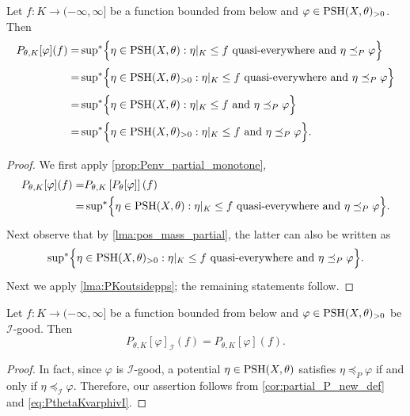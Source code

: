 \begin{corollary}\label{cor:partial_P_new_def}
    Let $f\colon K\rightarrow (-\infty,\infty]$ be a function bounded from below and $\varphi \in \mathrm{PSH}(X,\theta)_{>0}$. Then
    \[
    \begin{aligned}
    P_{\theta,K}[\varphi](f)= & \operatorname*{sup}_{}{}\!{}^{*} \Bigl\{ \eta \in \mathrm{PSH}(X,\theta): \eta|_K \leq f  \textup{ quasi-everywhere and } \eta\preceq_P \varphi\Bigr\}\\
    =& \operatorname*{sup}_{}{}\!{}^{*} \Bigl\{ \eta \in \mathrm{PSH}(X,\theta)_{>0}: \eta|_K \leq f  \textup{ quasi-everywhere and } \eta\preceq_P \varphi\Bigr\}\\
    =& \operatorname*{sup}_{}{}\!{}^{*} \Bigl\{ \eta \in \mathrm{PSH}(X,\theta): \eta|_K \leq f  \textup{ and } \eta\preceq_P \varphi\Bigr\}\\
    =& \operatorname*{sup}_{}{}\!{}^{*} \Bigl\{ \eta \in \mathrm{PSH}(X,\theta)_{>0}: \eta|_K \leq f  \textup{ and } \eta\preceq_P \varphi\Bigr\}.
    \end{aligned}
    \]
\end{corollary}
\begin{proof}
    We first apply \cref{prop:Penv_partial_monotone},
    \[
    \begin{split}
    P_{\theta,K}[\varphi](f)= & P_{\theta,K}\left[P_{\theta}[\varphi]\right](f)\\
    =& \operatorname*{sup}_{}{}\!{}^{*} \Bigl\{ \eta \in \mathrm{PSH}(X,\theta): \eta|_K \leq f  \textup{ quasi-everywhere and } \eta\preceq_P \varphi\Bigr\}.
    \end{split}
    \]
    Next observe that by \cref{lma:pos_mass_partial}, the latter can also be written as
    \[
    \operatorname*{sup}_{}{}\!{}^{*} \Bigl\{ \eta \in \mathrm{PSH}(X,\theta)_{>0}: \eta|_K \leq f  \textup{ quasi-everywhere and } \eta\preceq_P \varphi\Bigr\}.
    \]
    Next we apply \cref{lma:PKoutsidepps}; the remaining statements follow.
\end{proof}

\begin{corollary}\label{cor:I-good_partial_env}
    Let $f\colon K\rightarrow (-\infty,\infty]$ be a function bounded from below and $\varphi \in \mathrm{PSH}(X,\theta)_{>0}$ be $\mathcal{I}$-good. Then
    \[
        P_{\theta,K}[\varphi]_{\mathcal{I}}(f)=P_{\theta,K}[\varphi](f).
    \]
\end{corollary}
\begin{proof}
    In fact, since $\varphi$ is $\mathcal{I}$-good, a potential $\eta\in \mathrm{PSH}(X,\theta)$ satisfies $\eta\preceq_P \varphi$ if and only if $\eta\preceq_{\mathcal{I}} \varphi$. Therefore, our assertion follows from \cref{cor:partial_P_new_def} and \eqref{eq:PthetaKvarphivI}.
\end{proof}



